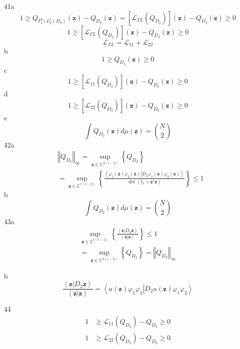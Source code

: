 \documentclass[aps,preprint]{revtex4}%
\begin{document}
41a%
\[
1\geq Q_{\Gamma_{1}^{2}\circ L_{2}^{1}\left(  D_{2}\right)  }\left(
\mathbf{z}\right)  -Q_{D_{2}}\left(  \mathbf{z}\right)  =\left[
\mathcal{L}_{\Gamma L}\left(  Q_{D_{2}}\right)  \right]  \left(
\mathbf{z}\right)  -Q_{D_{2}}\left(  \mathbf{z}\right)  \geq0
\]%
\[
1\geq\left[  \mathcal{L}_{\Gamma L}\left(  Q_{D_{2}}\right)  \right]  \left(
\mathbf{z}\right)  -Q_{D_{2}}\left(  \mathbf{z}\right)  \geq0
\]%
\[
\mathcal{L}_{\Gamma L}=\mathcal{L}_{11}+\mathcal{L}_{22}%
\]
b%
\[
1\geq Q_{D_{2}}\left(  \mathbf{z}\right)  \geq0
\]
c%
\[
1\geq\left[  \mathcal{L}_{11}\left(  Q_{D_{2}}\right)  \right]  \left(
\mathbf{z}\right)  -Q_{D_{2}}\left(  \mathbf{z}\right)  \geq0
\]
d%
\[
1\geq\left[  \mathcal{L}_{22}\left(  Q_{D_{2}}\right)  \right]  \left(
\mathbf{z}\right)  -Q_{D_{2}}\left(  \mathbf{z}\right)  \geq0
\]
e%
\[
\int Q_{D_{2}}\left(  \mathbf{z}\right)  d\mu\left(  \mathbf{z}\right)
=\binom{N}{2}%
\]
42a%
\begin{align*}
&  \left\Vert Q_{D_{2}}\right\Vert _{\infty}=\sup_{\mathbf{z\in}%
\mathbb{C}^{2\left(  r-2\right)  }}\left\{  Q_{D_{2}}\right\}  \\
&  =\sup_{\mathbf{z\in}\mathbb{C}^{r\left(  r-2\right)  }}\left\{
\frac{\left\langle \varphi_{1}\left(  \mathbf{z}\right)  \varphi_{2}\left(
\mathbf{z}\right)  \left\vert D_{2}\varphi_{1}\left(  \mathbf{z}\right)
\varphi_{2}\left(  \mathbf{z}\right)  \right.  \right\rangle }{\det\left(
\mathbb{I}_{2}+\mathbf{z}^{\dagger}\mathbf{z}\right)  }\right\}  \leq1
\end{align*}
b%
\[
\int Q_{D_{2}}\left(  \mathbf{z}\right)  d\mu\left(  \mathbf{z}\right)
=\binom{N}{2}%
\]
43a%
\begin{gather*}
\sup_{\mathbf{z\in}\mathbb{C}^{r\left(  r-2\right)  }}\left\{  \frac
{\left\langle \mathbf{z}\left\vert D_{2}\mathbf{z}\right.  \right\rangle
}{\left\langle \mathbf{z}\left\vert \mathbf{z}\right.  \right\rangle
}\right\}  \leq1\\
=\sup_{\mathbf{z\in}\mathbb{C}^{2\left(  r-2\right)  }}\left\{  Q_{D_{2}%
}\right\}  =\left\Vert Q_{D_{2}}\right\Vert _{\infty}%
\end{gather*}


b%
\[
\frac{\left\langle \mathbf{z}\left\vert D_{2}\mathbf{z}\right.  \right\rangle
}{\left\langle \mathbf{z}\left\vert \mathbf{z}\right.  \right\rangle
}=\left\langle u\left(  \mathbf{z}\right)  \varphi_{1}\varphi_{2}\left\vert
D_{2}u\left(  \mathbf{z}\right)  \varphi_{1}\varphi_{2}\right.  \right\rangle
\]


44%
\begin{align*}
1  &  \geq\mathcal{L}_{11}\left(  Q_{D_{2}}\right)  -Q_{D_{2}}\geq0\\
1  &  \geq\mathcal{L}_{22}\left(  Q_{D_{2}}\right)  -Q_{D_{2}}\geq0
\end{align*}
\end{document}
